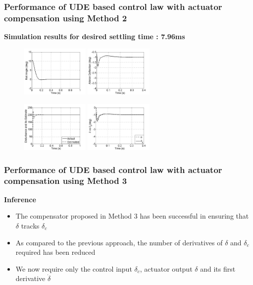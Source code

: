 \documentclass[table,10pt,red]{beamer}	%
\begin{document}
\begin{frame}
\frametitle{Performance of UDE based control law with actuator compensation using Method 2}
\textbf{Simulation results for desired settling time : 7.96ms}
\begin{figure}[h]
\includegraphics[width=3.3cm]{fig11a}
\includegraphics[width=3.3cm]{fig11b}
\end{figure}
\begin{figure}
\includegraphics[width=3.3cm]{fig11c}
\includegraphics[width=3.3cm]{fig11d}
\end{figure}
\end{frame}
\begin{frame}
\frametitle{Performance of UDE based control law with actuator compensation using Method 3}
\textbf{Inference}
\begin{itemize}
\item The compensator proposed in Method 3 has been successful in ensuring that $\delta$ tracks $\delta_c$
\item As compared to the previous approach, the number of derivatives of $\delta$ and $\delta_c$ required has been reduced
\item We now require only the control input $\delta_c$, actuator output $\delta$ and its first derivative $\dot{\delta}$
\end{itemize}
\end{frame}
\end{document}
